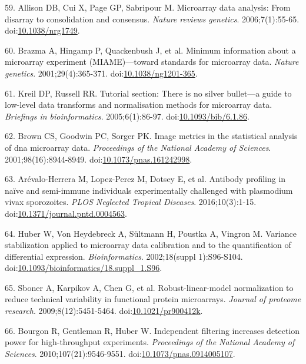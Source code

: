 \documentclass[]{article}
\begin{document}
\hypertarget{ref-allison2006}{}
59. Allison DB, Cui X, Page GP, Sabripour M. Microarray data analysis:
From disarray to consolidation and consensus. \emph{Nature reviews
genetics}. 2006;7(1):55-65.
doi:\href{https://doi.org/10.1038/nrg1749}{10.1038/nrg1749}.

\hypertarget{ref-brazma2001}{}
60. Brazma A, Hingamp P, Quackenbush J, et al. Minimum information about
a microarray experiment (MIAME)---toward standards for microarray data.
\emph{Nature genetics}. 2001;29(4):365-371.
doi:\href{https://doi.org/10.1038/ng1201-365}{10.1038/ng1201-365}.

\hypertarget{ref-kreil2005bullet}{}
61. Kreil DP, Russell RR. Tutorial section: There is no silver
bullet---a guide to low-level data transforms and normalisation methods
for microarray data. \emph{Briefings in bioinformatics}.
2005;6(1):86-97.
doi:\href{https://doi.org/10.1093/bib/6.1.86}{10.1093/bib/6.1.86}.

\hypertarget{ref-brown2001image}{}
62. Brown CS, Goodwin PC, Sorger PK. Image metrics in the statistical
analysis of dna microarray data. \emph{Proceedings of the National
Academy of Sciences}. 2001;98(16):8944-8949.
doi:\href{https://doi.org/10.1073/pnas.161242998}{10.1073/pnas.161242998}.

\hypertarget{ref-arevalo2016}{}
63. Arévalo-Herrera M, Lopez-Perez M, Dotsey E, et al. Antibody
profiling in naïve and semi-immune individuals experimentally challenged
with plasmodium vivax sporozoites. \emph{PLOS Neglected Tropical
Diseases}. 2016;10(3):1-15.
doi:\href{https://doi.org/10.1371/journal.pntd.0004563}{10.1371/journal.pntd.0004563}.

\hypertarget{ref-huber2002vsn}{}
64. Huber W, Von Heydebreck A, Sültmann H, Poustka A, Vingron M.
Variance stabilization applied to microarray data calibration and to the
quantification of differential expression. \emph{Bioinformatics}.
2002;18(suppl 1):S96-S104.
doi:\href{https://doi.org/10.1093/bioinformatics/18.suppl_1.S96}{10.1093/bioinformatics/18.suppl\_1.S96}.

\hypertarget{ref-sboner2009rlm}{}
65. Sboner A, Karpikov A, Chen G, et al. Robust-linear-model
normalization to reduce technical variability in functional protein
microarrays. \emph{Journal of proteome research}. 2009;8(12):5451-5464.
doi:\href{https://doi.org/10.1021/pr900412k}{10.1021/pr900412k}.

\hypertarget{ref-bourgon2010filter}{}
66. Bourgon R, Gentleman R, Huber W. Independent filtering increases
detection power for high-throughput experiments. \emph{Proceedings of
the National Academy of Sciences}. 2010;107(21):9546-9551.
doi:\href{https://doi.org/10.1073/pnas.0914005107}{10.1073/pnas.0914005107}.
\end{document}

